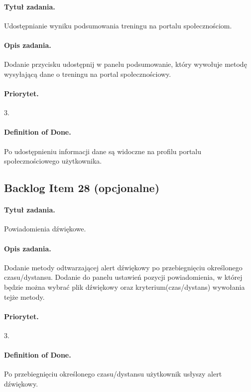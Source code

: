 \documentclass[a4paper]{article}
\begin{document}
\paragraph{Tytuł zadania.} Udostępnianie wyniku podsumowania treningu na portalu społecznościom.
\paragraph{Opis zadania.} Dodanie przycisku udostępnij w panelu podsumowanie, który wywołuje metodę wysyłającą dane o treningu na portal społecznościowy.
\paragraph{Priorytet.} 3.
\paragraph{Definition of Done.} Po udostępnieniu informacji dane są widoczne na profilu portalu społecznościowego użytkownika.

\subsection{Backlog Item 28 (opcjonalne)}
\paragraph{Tytuł zadania.} Powiadomienia dźwiękowe.
\paragraph{Opis zadania.} Dodanie metody odtwarzającej alert dźwiękowy po przebiegnięciu określonego czasu/dystansu. Dodanie do panelu ustawień pozycji powiadomienia, w której będzie można wybrać plik dźwiękowy oraz kryterium(czas/dystans) wywołania tejże metody.
\paragraph{Priorytet.} 3.
\paragraph{Definition of Done.} Po przebiegnięciu określonego czasu/dystansu użytkownik usłyszy alert dźwiękowy.
\end{document}
